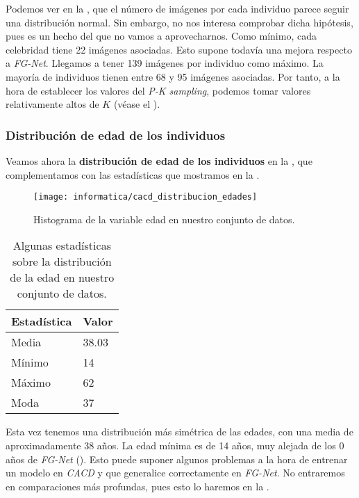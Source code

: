Podemos ver en la , que el número de imágenes por cada individuo parece seguir una distribución normal. Sin embargo, no nos interesa comprobar dicha hipótesis, pues es un hecho del que no vamos a aprovecharnos. Como mínimo, cada celebridad tiene 22 imágenes asociadas. Esto supone todavía una mejora respecto a \textit{FG-Net}. Llegamos a tener 139 imágenes por individuo como máximo. La mayoría de individuos tienen entre 68 y 95 imágenes asociadas. Por tanto, a la hora de establecer los valores del \textit{P-K sampling}, podemos tomar valores relativamente altos de $K$ (véase el ).

\subsubsection{Distribución de edad de los individuos}

Veamos ahora la \textbf{distribución de edad de los individuos} en la , que complementamos con las estadísticas que mostramos en la .

\begin{figure}[!hbtp]
    \centering
    \texttt{[image: informatica/cacd\_distribucion\_edades]}
    \caption{Histograma de la variable edad en nuestro conjunto de datos.}
    \label{img:cacd_distribucion_edades_img}
\end{figure}

\begin{table}[!hbtp]
\centering
\begin{tabular}{|l|l|}
    \hline
    \textbf{Estadística} & \textbf{Valor} \\
    \hline

    Media  & 38.03 \\
    Mínimo & 14    \\
    Máximo & 62    \\
    Moda   & 37    \\

    \hline

\end{tabular}
\caption{Algunas estadísticas sobre la distribución de la edad en nuestro conjunto de datos.}
\label{table:estadisticas_cacd_distr_edad}
\end{table}

Esta vez tenemos una distribución más simétrica de las edades, con una media de aproximadamente 38 años. La edad mínima es de 14 años, muy alejada de los 0 años de \textit{FG-Net} (). Esto puede suponer algunos problemas a la hora de entrenar un modelo en \textit{CACD} y que generalice correctamente en \textit{FG-Net}. No entraremos en comparaciones más profundas, pues esto lo haremos en la .

